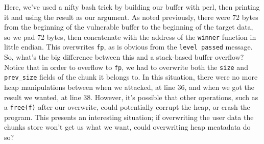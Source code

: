Here, we've used a nifty bash trick by building our buffer with perl, then
printing it and using the result as our argument. As noted previously, there
were 72 bytes from the beginning of the vulnerable buffer to the beginning
of the target data, so we pad 72 bytes, then concatenate with the address
of the \texttt{winner} function in little endian. This overwrites \texttt{fp},
as is obvious from the \texttt{level passed} message.\\

So, what's the big difference between this and a stack-based buffer overflow?
Notice that in order to overflow to \texttt{fp}, we had to overwrite
both the \texttt{size} and \texttt{prev\_size} fields of the chunk
it belongs to. In this situation, there were no more heap manipulations
between when we attacked, at line 36, and when we got the result we
wanted, at line 38. However, it's possible that other operations, such
as a \texttt{free(f)} after our overwrite, could potentially corrupt the heap,
or crash the program. This presents an interesting situation; if overwriting
the user data the chunks store won't get us what we want, could overwriting
heap meatadata do so?
